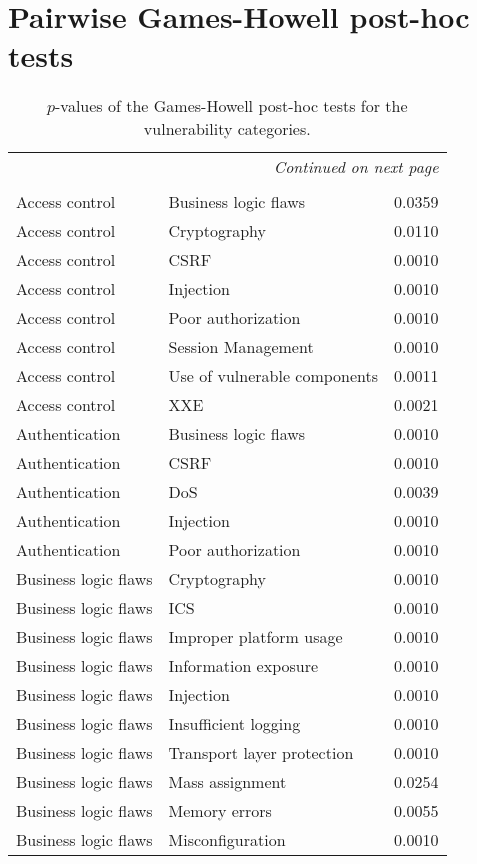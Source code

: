 \chapter{Pairwise Games-Howell post-hoc tests}
\label{app:pairups}

{\footnotesize
\begin{longtable}{lll}
\caption[Games-Howell tests for categories]{$p$-values of the Games-Howell post-hoc tests for the vulnerability categories.}\\
\endfirsthead
\multicolumn{3}{r}{\textit{Continued on next page}} \\
\endfoot
\\
\endlastfoot
Access control & Business logic flaws & 0.0359\\
Access control & Cryptography & 0.0110\\
Access control & CSRF & 0.0010\\
Access control & Injection & 0.0010\\
Access control & Poor authorization & 0.0010\\
Access control & Session Management & 0.0010\\
Access control & Use of vulnerable components & 0.0011\\
Access control & XXE & 0.0021\\
Authentication & Business logic flaws & 0.0010\\
Authentication & CSRF & 0.0010\\
Authentication & DoS & 0.0039\\
Authentication & Injection & 0.0010\\
Authentication & Poor authorization & 0.0010\\
Business logic flaws & Cryptography & 0.0010\\
Business logic flaws & ICS & 0.0010\\
Business logic flaws & Improper platform usage & 0.0010\\
Business logic flaws & Information exposure & 0.0010\\
Business logic flaws & Injection & 0.0010\\
Business logic flaws & Insufficient logging & 0.0010\\
Business logic flaws & Transport layer protection & 0.0010\\
Business logic flaws & Mass assignment & 0.0254\\
Business logic flaws & Memory errors & 0.0055\\
Business logic flaws & Misconfiguration & 0.0010\\

\end{longtable}}
